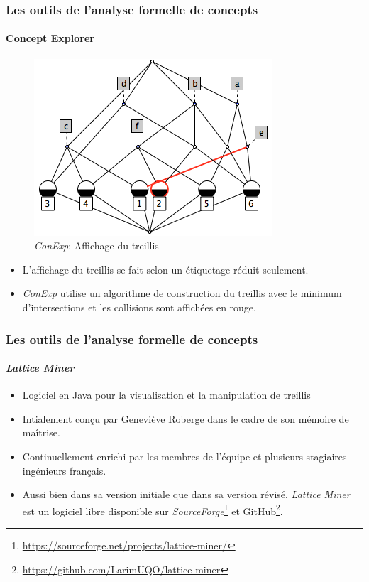 \documentclass[french]{beamer}
\newcommand{\lm}{\emph{Lattice Miner}\xspace}
\begin{document}
\begin{frame}
\frametitle{Les outils de l'analyse formelle de concepts}
\framesubtitle{Concept Explorer}
\begin{figure}[H]
\begin{center}\includegraphics[scale=0.45]{figures/conexp-lattice.png}\end{center}
\caption{\emph{ConExp}: Affichage du treillis}
\label{cap:fig:conexp-lattice}
\end{figure}
\begin{itemize}
\item L'affichage du treillis se fait selon un étiquetage réduit seulement.
\item \emph{ConExp} utilise un algorithme de construction du treillis avec le minimum d'intersections et les collisions sont affichées en rouge.
\end{itemize}
\end{frame}
\begin{frame}
\frametitle{Les outils de l'analyse formelle de concepts}
\framesubtitle{\lm}
\begin{itemize}
\item Logiciel en Java pour la visualisation et la manipulation de treillis
\item Intialement conçu par Geneviève Roberge dans le cadre de son mémoire de maîtrise.
\item Continuellement enrichi par les membres de l'équipe et plusieurs stagiaires ingénieurs français.
\item Aussi bien dans sa version initiale que dans sa version révisé, \lm est un logiciel libre disponible sur \emph{SourceForge}\footnote{\url{https://sourceforge.net/projects/lattice-miner/}} et GitHub\footnote{\url{https://github.com/LarimUQO/lattice-miner}}.
\end{itemize}
\end{frame}
\end{document}
